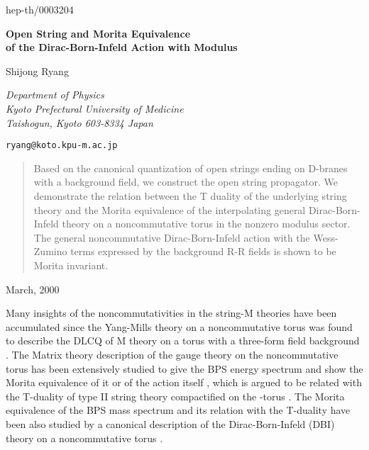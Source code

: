 \documentclass[12pt,a4paper]{article}
\begin{document}
\begin{flushright}
hep-th/0003204
\end{flushright}
\vspace{1.8cm}

\begin{center}
\textbf{\Large Open String and Morita Equivalence \\
of the Dirac-Born-Infeld Action with Modulus \myHighlight{$\Phi$}\coordHE{}}
\end{center}
\vspace{1.6cm}
\begin{center}
 Shijong Ryang
\end{center}

\begin{center}
\textit{Department of Physics \\ Kyoto Prefectural University of Medicine
\\ Taishogun, Kyoto 603-8334 Japan}
\par
\texttt{ryang@koto.kpu-m.ac.jp}
\end{center}
\vspace{2.8cm}
\begin{abstract}
Based on the canonical quantization of open strings ending on D-branes
with a background \coordHE{} field, we construct the open string propagator.
We demonstrate the relation between the T duality of the
underlying string theory and the Morita equivalence of the 
interpolating general Dirac-Born-Infeld theory on a noncommutative torus
in the nonzero modulus \myHighlight{$\Phi$}\coordHE{} sector. The general noncommutative 
Dirac-Born-Infeld action with the Wess-Zumino terms expressed by the 
background R-R fields is shown to be Morita invariant.
\end{abstract}
\vspace{3cm}
\begin{flushleft}
March, 2000
\end{flushleft}
\newpage
Many insights of the noncommutativities in the string-M theories have 
been accumulated since the Yang-Mills theory on a noncommutative torus was
found to describe the DLCQ of M theory on a torus with a three-form field
background  \cite{CDS}. The Matrix theory description of the gauge 
theory on the noncommutative torus has been extensively studied 
\cite{NCY} to give the BPS energy spectrum and show the Morita 
equivalence of it \cite{PH,BM,KS} or of the action itself \cite{AS,BMZ},
which is argued to be related with the T-duality \coordHE{} of type II 
string theory compactified on the \coordHE{}-torus \cite{BMZ,PS}. The Morita 
equivalence of the BPS mass spectrum and its relation with the T-duality
have been also studied by a canonical description of the Dirac-Born-Infeld
(DBI) theory on a noncommutative torus \cite{HV}. 
\end{document}
